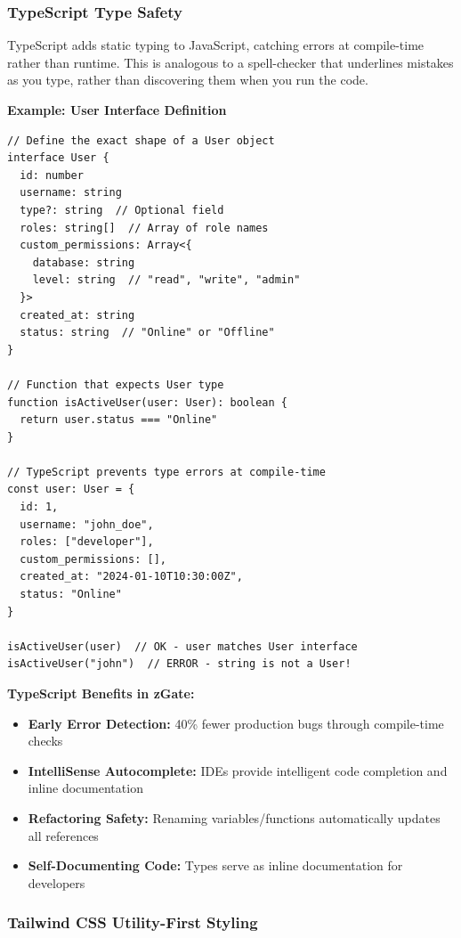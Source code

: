 \subsubsection{TypeScript Type Safety}

TypeScript adds static typing to JavaScript, catching errors at compile-time rather than runtime. This is analogous to a spell-checker that underlines mistakes as you type, rather than discovering them when you run the code.

\textbf{Example: User Interface Definition}

\begin{lstlisting}[style=code, caption=TypeScript Interface for Type-Safe Data Structures]
// Define the exact shape of a User object
interface User {
  id: number
  username: string
  type?: string  // Optional field
  roles: string[]  // Array of role names
  custom_permissions: Array<{
    database: string
    level: string  // "read", "write", "admin"
  }>
  created_at: string
  status: string  // "Online" or "Offline"
}

// Function that expects User type
function isActiveUser(user: User): boolean {
  return user.status === "Online"
}

// TypeScript prevents type errors at compile-time
const user: User = {
  id: 1,
  username: "john_doe",
  roles: ["developer"],
  custom_permissions: [],
  created_at: "2024-01-10T10:30:00Z",
  status: "Online"
}

isActiveUser(user)  // OK - user matches User interface
isActiveUser("john")  // ERROR - string is not a User!
\end{lstlisting}

\textbf{TypeScript Benefits in zGate:}
\begin{itemize}
    \item \textbf{Early Error Detection:} 40\% fewer production bugs through compile-time checks
    \item \textbf{IntelliSense Autocomplete:} IDEs provide intelligent code completion and inline documentation
    \item \textbf{Refactoring Safety:} Renaming variables/functions automatically updates all references
    \item \textbf{Self-Documenting Code:} Types serve as inline documentation for developers
\end{itemize}

\subsubsection{Tailwind CSS Utility-First Styling}

